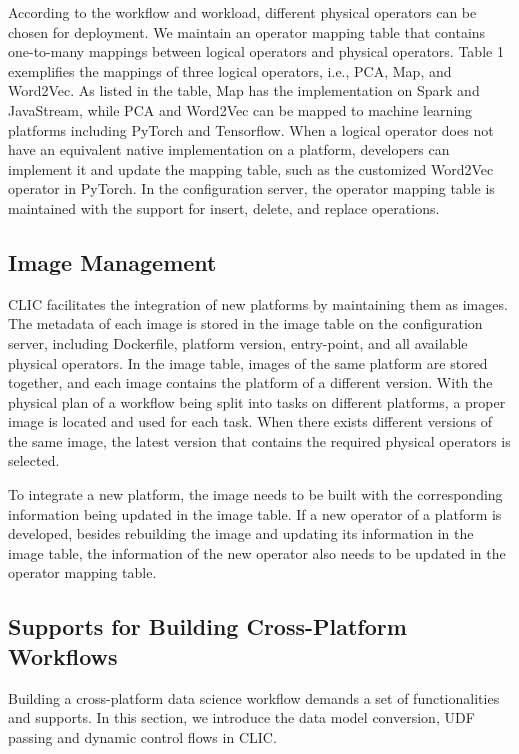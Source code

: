 According to the workflow and workload, different physical operators can be chosen for deployment. 
We maintain an operator mapping table that contains one-to-many mappings between logical operators and physical operators. 
Table 1 exemplifies the mappings of three logical operators, i.e., PCA, Map, and Word2Vec. 
As listed in the table, Map has the implementation on Spark and JavaStream, while PCA and Word2Vec can be mapped to machine learning platforms including PyTorch and Tensorflow. 
When a logical operator does not have an equivalent native implementation on a platform, developers can implement it and update the mapping table, such as the customized Word2Vec operator in PyTorch. 
In the configuration server, the operator mapping table is maintained with the support for insert, delete, and replace operations.

\subsection{Image Management}
CLIC facilitates the integration of new platforms by maintaining them as images. 
The metadata of each image is stored in the image table on the configuration server, including Dockerfile, platform version, entry-point, and all available physical operators. 
In the image table, images of the same platform are stored together, and each image contains the platform of a different version. 
With the physical plan of a workflow being split into tasks on different platforms, a proper image is located and used for each task. 
When there exists different versions of the same image, the latest version that contains the required physical operators is selected.

To integrate a new platform, the image needs to be built with the corresponding information being updated in the image table.
If a new operator of a platform is developed, besides rebuilding the image and updating its information in the image table, 
the information of the new operator also needs to be updated in the operator mapping table.


\subsection{Supports for Building Cross-Platform Workflows}
Building a cross-platform data science workflow demands a set of functionalities and supports. 
In this section, we introduce the data model conversion, UDF passing and dynamic control flows in CLIC.


